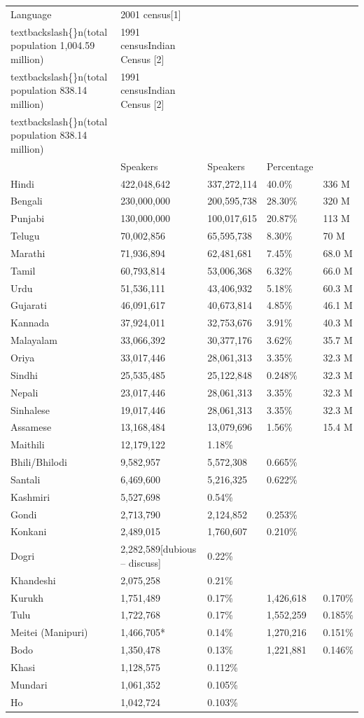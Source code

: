\documentclass{article}
\begin{document}
\begin{tabular}{lllll}
\toprule
Language & 2001 census[1]\\textbackslash\{\}n(total population 1,004.59 million) & 1991 censusIndian Census [2]\\textbackslash\{\}n(total population 838.14 million) & 1991 censusIndian Census [2]\\textbackslash\{\}n(total population 838.14 million) &  \\
\midrule
 & Speakers & Speakers & Percentage &  \\
Hindi & 422,048,642 & 337,272,114 & 40.0\% & 336 M \\
Bengali & 230,000,000 & 200,595,738 & 28.30\% & 320 M \\
Punjabi & 130,000,000 & 100,017,615 & 20.87\% & 113 M \\
Telugu & 70,002,856 & 65,595,738 & 8.30\% & 70 M \\
Marathi & 71,936,894 & 62,481,681 & 7.45\% & 68.0 M \\
Tamil & 60,793,814 & 53,006,368 & 6.32\% & 66.0 M \\
Urdu & 51,536,111 & 43,406,932 & 5.18\% & 60.3 M \\
Gujarati & 46,091,617 & 40,673,814 & 4.85\% & 46.1 M \\
Kannada & 37,924,011 & 32,753,676 & 3.91\% & 40.3 M \\
Malayalam & 33,066,392 & 30,377,176 & 3.62\% & 35.7 M \\
Oriya & 33,017,446 & 28,061,313 & 3.35\% & 32.3 M \\
Sindhi & 25,535,485 & 25,122,848 & 0.248\% & 32.3 M \\
Nepali & 23,017,446 & 28,061,313 & 3.35\% & 32.3 M \\
Sinhalese & 19,017,446 & 28,061,313 & 3.35\% & 32.3 M \\
Assamese & 13,168,484 & 13,079,696 & 1.56\% & 15.4 M \\
Maithili & 12,179,122 & 1.18\% &  &  \\
Bhili/Bhilodi & 9,582,957 & 5,572,308 & 0.665\% &  \\
Santali & 6,469,600 & 5,216,325 & 0.622\% &  \\
Kashmiri & 5,527,698 & 0.54\% &  &  \\
Gondi & 2,713,790 & 2,124,852 & 0.253\% &  \\
Konkani & 2,489,015 & 1,760,607 & 0.210\% &  \\
Dogri & 2,282,589[dubious – discuss] & 0.22\% &  &  \\
Khandeshi & 2,075,258 & 0.21\% &  &  \\
Kurukh & 1,751,489 & 0.17\% & 1,426,618 & 0.170\% \\
Tulu & 1,722,768 & 0.17\% & 1,552,259 & 0.185\% \\
Meitei (Manipuri) & 1,466,705* & 0.14\% & 1,270,216 & 0.151\% \\
Bodo & 1,350,478 & 0.13\% & 1,221,881 & 0.146\% \\
Khasi & 1,128,575 & 0.112\% &  &  \\
Mundari & 1,061,352 & 0.105\% &  &  \\
Ho & 1,042,724 & 0.103\% &  &  \\
\bottomrule
\end{tabular}
\end{document}
